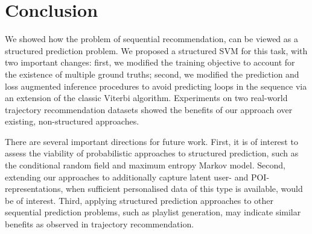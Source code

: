 
\secmoveup
\section{Conclusion}
\textmoveup

We showed how the problem of sequential recommendation,
can be viewed as a structured prediction problem.
We proposed a structured SVM for this task, with two important changes:
first, we modified the training objective to account for the existence of multiple ground truths;
second, we modified the prediction and loss augmented inference procedures to avoid predicting loops in the sequence via an extension of the classic Viterbi algorithm.
Experiments on two real-world trajectory recommendation datasets showed the benefits of our approach over existing, non-structured approaches.

There are several important directions for future work.
First, it is of interest to assess the viability of probabilistic approaches to structured prediction,
such as the conditional random field and maximum entropy Markov model.
Second, extending our approaches to additionally capture latent user- and POI-representations, when sufficient personalised data of this type is available, would be of interest.
Third, applying structured prediction approaches to other sequential prediction problems, such as playlist generation, may indicate similar benefits as observed in trajectory recommendation.
